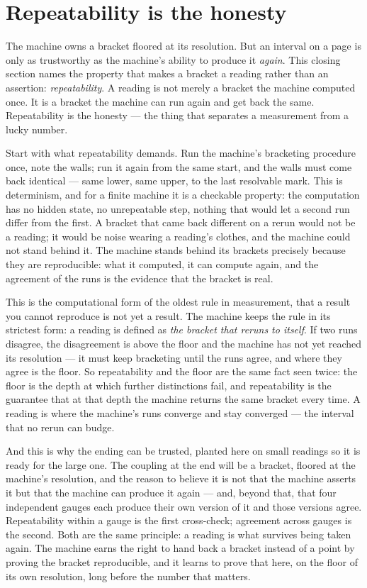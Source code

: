 \section{Repeatability is the honesty}

The machine owns a bracket floored at its resolution. But an interval on a page is only as trustworthy as the machine's
ability to produce it \emph{again}. This closing section names the property that makes a bracket a reading rather than an
assertion: \emph{repeatability}. A reading is not merely a bracket the machine computed once. It is a bracket the machine
can run again and get back the same. Repeatability is the honesty --- the thing that separates a measurement from a
lucky number.

Start with what repeatability demands. Run the machine's bracketing procedure once, note the walls; run it again from
the same start, and the walls must come back identical --- same lower, same upper, to the last resolvable mark. This is
determinism, and for a finite machine it is a checkable property: the computation has no hidden state, no unrepeatable
step, nothing that would let a second run differ from the first. A bracket that came back different on a rerun would not
be a reading; it would be noise wearing a reading's clothes, and the machine could not stand behind it. The machine
stands behind its brackets precisely because they are reproducible: what it computed, it can compute again, and the
agreement of the runs is the evidence that the bracket is real.

This is the computational form of the oldest rule in measurement, that a result you cannot reproduce is not yet a
result. The machine keeps the rule in its strictest form: a reading is defined as \emph{the bracket that reruns to
itself}. If two runs disagree, the disagreement is above the floor and the machine has not yet reached its resolution ---
it must keep bracketing until the runs agree, and where they agree is the floor. So repeatability and the floor are the
same fact seen twice: the floor is the depth at which further distinctions fail, and repeatability is the guarantee that
at that depth the machine returns the same bracket every time. A reading is where the machine's runs converge and stay
converged --- the interval that no rerun can budge.

And this is why the ending can be trusted, planted here on small readings so it is ready for the large one. The coupling
at the end will be a bracket, floored at the machine's resolution, and the reason to believe it is not that the machine
asserts it but that the machine can produce it again --- and, beyond that, that four independent gauges each produce their
own version of it and those versions agree. Repeatability within a gauge is the first cross-check; agreement across
gauges is the second. Both are the same principle: a reading is what survives being taken again. The machine earns the
right to hand back a bracket instead of a point by proving the bracket reproducible, and it learns to prove that here,
on the floor of its own resolution, long before the number that matters.

